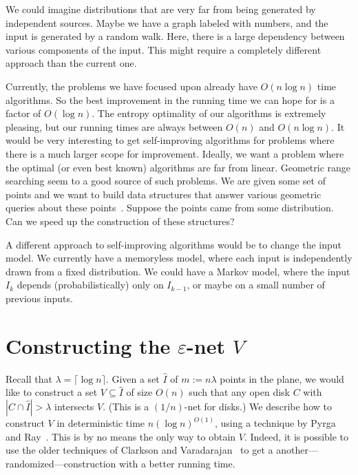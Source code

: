 \documentclass{siamltex}
\newcommand{\eps}{\varepsilon}
\newcommand{\eqdef}{:=}
\begin{document}
We could imagine distributions that are very far from being generated by
independent sources. Maybe we have a graph labeled with numbers, and the input
is generated by a random walk. Here, there is a large dependency between
various components of the input. This might require a completely different
approach than the current one.

Currently, the problems we have focused upon already have $O(n\log n)$ time
algorithms.  So the best improvement in the running time we can hope for is a
factor of $O(\log n)$. The entropy optimality of our algorithms is extremely
pleasing, but our running times are always between $O(n)$ and $O(n\log n)$.  It
would be very interesting to get self-improving algorithms for problems where
there is a much larger scope for improvement. Ideally, we want a problem where
the optimal (or even best known) algorithms are far from linear. Geometric
range searching seem to a good source of such problems. We are given some set
of points and we want to build data structures that answer various geometric
queries about these points~\cite{AE98}. Suppose the points came from some
distribution.  Can we speed up the construction of these structures? 

A different approach to self-improving algorithms would be to change the input
model. We currently have a memoryless model, where each input is independently
drawn from a fixed distribution.  We could have a Markov model, where the input
$I_k$ depends (probabilistically) only on $I_{k-1}$, or maybe on a small number
of previous inputs. 








\appendix
\section{Constructing the $\eps$-net $V$}\label{app:epsnet}
Recall that $\lambda = \lceil \log n \rceil$.
Given a set $\hat I$ of $m \eqdef n\lambda$ points in the plane,
we would like to construct a set $V \subseteq \hat I$ of size
$O(n)$ such that any open disk $C$ with 
$|C \cap \hat I| > \lambda$ intersects $V$. (This is
a $(1/n)$-net for disks.)
We describe how to construct $V$ in deterministic
time $n(\log n)^{O(1)}$, using  a technique by
Pyrga and Ray~\cite{PyrgaRa08}. This is by no means the
only way to obtain $V$. Indeed, it is possible 
to use the older techniques of Clarkson and Varadarajan~\cite{CV}
to get a another---randomized---construction with a better running time.
\end{document}
